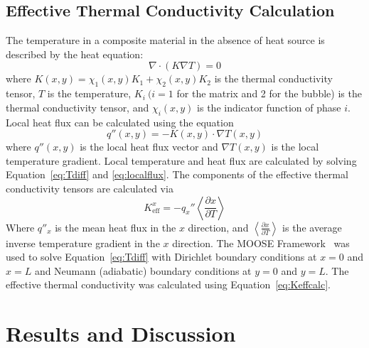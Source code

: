 \subsection{Effective Thermal Conductivity Calculation}
\label{subsec:Keffcalc}
The temperature in a composite material in the absence of heat source is described by the heat equation:
\begin{equation}
\nabla \cdot \left(K\nabla T \right)=0
\label{eq:Tdiff}
\end{equation}
where $K(x,y)=\chi_1(x,y)K_1 + \chi_2(x,y)K_2$ is the thermal conductivity tensor, $T$ is the temperature, $K_i\ { }(i=1$ for the matrix and 2 for the bubble) is the thermal conductivity tensor, and $\chi_i(x,y)$ is the indicator function of phase $i$. Local heat flux can be calculated using the equation
\begin{equation}
\label{eq:localflux}
q''(x,y) = -K(x,y) \cdot \nabla T(x,y)
\end{equation}
where $q''(x,y)$ is the local heat flux vector and $\nabla T(x,y)$ is the local temperature gradient. Local temperature and heat flux are calculated by solving Equation~\eqref{eq:Tdiff} and \eqref{eq:localflux}. The components of the effective thermal conductivity tensors are calculated via 
\begin{equation}
\label{eq:Keffcalc}
K_{\text{eff}}^x = -q_x''\left<\frac{\partial x}{\partial T}\right>
\end{equation}
Where $q''_x$ is the mean heat flux in the $x$ direction, and $\left<\frac{\partial x}{\partial T}\right>$ is the average inverse temperature gradient in the $x$ direction. The MOOSE Framework~\cite{gaston2009moose} was used to solve Equation~\eqref{eq:Tdiff} with Dirichlet boundary conditions at $x=0$ and $x=L$ and Neumann (adiabatic) boundary conditions at $y=0$ and $y=L$. The effective thermal conductivity was calculated using Equation~\eqref{eq:Keffcalc}.



\section{\label{sec:results}Results and Discussion}

